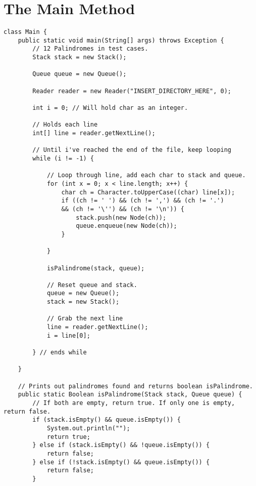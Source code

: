 \documentclass[letterpaper, 10pt,DIV=13]{scrartcl}
\numberwithin{equation}{section} %
\numberwithin{figure}{section} %
\numberwithin{table}{section} %
\begin{document}
\section{The Main Method}

\lstset{numbers=left, numberstyle=\tiny, stepnumber=1, numbersep=5pt, basicstyle=\footnotesize\ttfamily}
\begin{lstlisting}[frame=single, ]
class Main {
    public static void main(String[] args) throws Exception {
        // 12 Palindromes in test cases.
        Stack stack = new Stack();

        Queue queue = new Queue();

        Reader reader = new Reader("INSERT_DIRECTORY_HERE", 0);

        int i = 0; // Will hold char as an integer.

        // Holds each line 
        int[] line = reader.getNextLine();

        // Until i've reached the end of the file, keep looping
        while (i != -1) {

            // Loop through line, add each char to stack and queue.
            for (int x = 0; x < line.length; x++) {
                char ch = Character.toUpperCase((char) line[x]);
                if ((ch != ' ') && (ch != ',') && (ch != '.') 
                && (ch != '\'') && (ch != '\n')) {
                    stack.push(new Node(ch));
                    queue.enqueue(new Node(ch));
                }

            }

            isPalindrome(stack, queue);

            // Reset queue and stack.
            queue = new Queue();
            stack = new Stack();

            // Grab the next line
            line = reader.getNextLine();
            i = line[0];

        } // ends while

    }

    // Prints out palindromes found and returns boolean isPalindrome.
    public static Boolean isPalindrome(Stack stack, Queue queue) {
        // If both are empty, return true. If only one is empty, return false.
        if (stack.isEmpty() && queue.isEmpty()) {
            System.out.println("");
            return true;
        } else if (stack.isEmpty() && !queue.isEmpty()) {
            return false;
        } else if (!stack.isEmpty() && queue.isEmpty()) {
            return false;
        }


\end{lstlisting}
\end{document}
